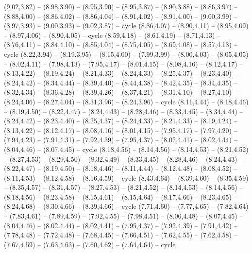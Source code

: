 \expandafter\def\csname geo:gebiet:BGD\endcsname{
  (9.02,3.82) -- (8.98,3.90) -- (8.95,3.90) -- (8.95,3.87) -- (8.90,3.88) -- (8.86,3.97) -- (8.88,4.00) -- (8.86,4.02) -- (8.86,4.04) -- (8.91,4.02) -- (8.91,4.00) -- (9.00,3.99) -- (8.97,3.93) -- (9.00,3.93) -- (9.02,3.87) -- cycle}
\expandafter\def\csname geo:gebiet:BTN\endcsname{
  (8.86,4.07) -- (8.90,4.11) -- (8.95,4.09) -- (8.97,4.06) -- (8.90,4.05) -- cycle}
\expandafter\def\csname geo:gebiet:NPL\endcsname{
  (8.59,4.18) -- (8.61,4.19) -- (8.71,4.13) -- (8.76,4.11) -- (8.84,4.10) -- (8.85,4.04) -- (8.75,4.05) -- (8.69,4.08) -- (8.57,4.13) -- cycle}
\expandafter\def\csname geo:gebiet:PAK\endcsname{
  (8.22,3.94) -- (8.19,3.95) -- (8.15,4.00) -- (7.99,3.99) -- (8.00,4.03) -- (8.05,4.05) -- (8.02,4.11) -- (7.98,4.13) -- (7.95,4.17) -- (8.01,4.15) -- (8.08,4.16) -- (8.12,4.17) -- (8.13,4.22) -- (8.19,4.24) -- (8.21,4.33) -- (8.24,4.33) -- (8.25,4.37) -- (8.23,4.40) -- (8.24,4.42) -- (8.34,4.44) -- (8.39,4.40) -- (8.44,4.38) -- (8.42,4.35) -- (8.34,4.35) -- (8.32,4.34) -- (8.36,4.28) -- (8.39,4.26) -- (8.37,4.21) -- (8.31,4.10) -- (8.27,4.10) -- (8.24,4.06) -- (8.27,4.04) -- (8.31,3.96) -- (8.24,3.96) -- cycle}
\expandafter\def\csname geo:gebiet:AFG\endcsname{
  (8.11,4.44) -- (8.18,4.46) -- (8.19,4.50) -- (8.22,4.47) -- (8.24,4.43) -- (8.28,4.46) -- (8.33,4.45) -- (8.34,4.44) -- (8.24,4.42) -- (8.23,4.40) -- (8.25,4.37) -- (8.24,4.33) -- (8.21,4.33) -- (8.19,4.24) -- (8.13,4.22) -- (8.12,4.17) -- (8.08,4.16) -- (8.01,4.15) -- (7.95,4.17) -- (7.97,4.20) -- (7.94,4.23) -- (7.91,4.31) -- (7.92,4.39) -- (7.95,4.37) -- (8.02,4.41) -- (8.02,4.44) -- (8.04,4.46) -- (8.07,4.45) -- cycle}
\expandafter\def\csname geo:gebiet:TJK\endcsname{
  (8.18,4.56) -- (8.14,4.56) -- (8.14,4.53) -- (8.21,4.52) -- (8.27,4.53) -- (8.29,4.50) -- (8.32,4.49) -- (8.33,4.45) -- (8.28,4.46) -- (8.24,4.43) -- (8.22,4.47) -- (8.19,4.50) -- (8.18,4.46) -- (8.11,4.44) -- (8.12,4.48) -- (8.08,4.52) -- (8.11,4.53) -- (8.12,4.58) -- (8.16,4.59) -- cycle}
\expandafter\def\csname geo:gebiet:KGZ\endcsname{
  (8.43,4.64) -- (8.39,4.60) -- (8.35,4.59) -- (8.35,4.57) -- (8.31,4.57) -- (8.27,4.53) -- (8.21,4.52) -- (8.14,4.53) -- (8.14,4.56) -- (8.18,4.56) -- (8.23,4.58) -- (8.15,4.61) -- (8.15,4.64) -- (8.17,4.66) -- (8.23,4.65) -- (8.24,4.68) -- (8.30,4.66) -- (8.39,4.66) -- cycle}
\expandafter\def\csname geo:gebiet:TKM\endcsname{
  (7.71,4.60) -- (7.77,4.65) -- (7.82,4.64) -- (7.83,4.61) -- (7.89,4.59) -- (7.92,4.55) -- (7.98,4.51) -- (8.06,4.48) -- (8.07,4.45) -- (8.04,4.46) -- (8.02,4.44) -- (8.02,4.41) -- (7.95,4.37) -- (7.92,4.39) -- (7.91,4.42) -- (7.78,4.48) -- (7.72,4.48) -- (7.68,4.45) -- (7.66,4.51) -- (7.62,4.55) -- (7.62,4.58) -- (7.67,4.59) -- (7.63,4.63) -- (7.60,4.62) -- (7.64,4.64) -- cycle}
